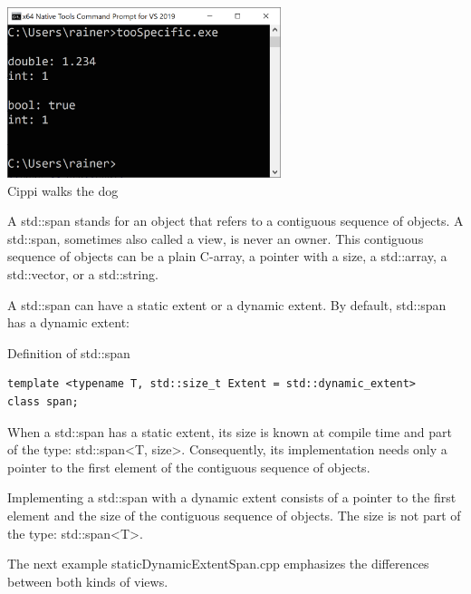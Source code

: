 \begin{center}
\includegraphics[width=0.6\textwidth]{content/3/chapter4/images/3.png}\\
Cippi walks the dog
\end{center}

A std::span stands for an object that refers to a contiguous sequence of objects. A std::span, sometimes also called a view, is never an owner. This contiguous sequence of objects can be a plain C-array, a pointer with a size, a std::array, a std::vector, or a std::string.

A std::span can have a static extent or a dynamic extent. By default, std::span has a dynamic extent:

\noindent
Definition of std::span
\begin{lstlisting}[style=styleCXX]
template <typename T, std::size_t Extent = std::dynamic_extent>
class span;
\end{lstlisting}


When a std::span has a static extent, its size is known at compile time and part of the type: std::span<T, size>. Consequently, its implementation needs only a pointer to the first element of the contiguous sequence of objects.

Implementing a std::span with a dynamic extent consists of a pointer to the first element and the size of the contiguous sequence of objects. The size is not part of the type: std::span<T>.

The next example staticDynamicExtentSpan.cpp emphasizes the differences between both kinds of views.

